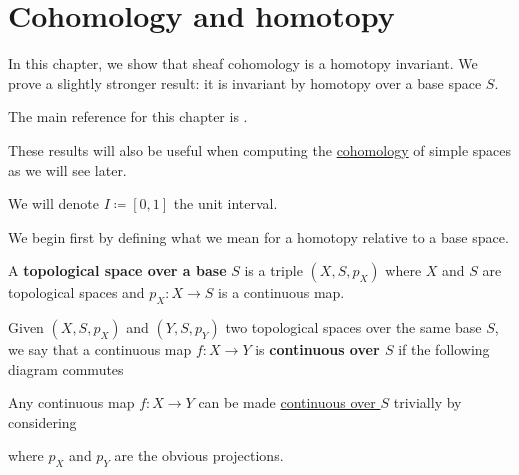 \documentclass[../../main]{subfiles}
\begin{document}
\chapter{Cohomology and homotopy}

In this chapter, we show that sheaf cohomology is a homotopy invariant.
We prove a slightly stronger result: it is invariant by homotopy over a base space \(S\).

The main reference for this chapter is \cite[Section 2.7]{kashiwaraSheavesManifolds1990}.

These results will also be useful when computing the \hyperref[def:sheaf-cohomology]{cohomology} of simple spaces as we will see later.

\begin{notation}
  We will denote \(I \coloneq [0, 1]\) the unit interval.
\end{notation}

We begin first by defining what we mean for a homotopy relative to a base space.

\begin{definition}\label{def:continuous-map-over}
  A \textbf{topological space over a base} \(S\) is a triple \((X, S, p_{X})\) where \(X\) and \(S\) are topological spaces and \(p_{X}\colon X \to S\) is a continuous map.
  
  Given \((X, S, p_{X})\) and \((Y, S, p_{Y})\) two topological spaces over the same base \(S\), we say that a continuous map \(f\colon X \to Y\) is \textbf{continuous over \(S\)} if the following diagram commutes
  \begin{center}
  \end{center}
\end{definition}

\begin{example}
  Any continuous map \(f\colon X \to Y\) can be made \hyperref[def:continuous-map-over]{continuous over \(S\)} trivially by considering
  \begin{center}
  \end{center}
  where \(p_{X}\) and \(p_{Y}\) are the obvious projections.
\end{example}
\end{document}
